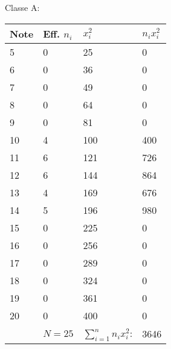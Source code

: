 \documentclass[a4paper,12pt]{scrartcl}
\begin{document}
\begin{figure}[h]
\begin{multicols}{2}
\begin{minipage}{0.49\linewidth}
\begin{center}
Classe A:
\end{center}

\begin{tabular}{|l|l|l|l|}
\hline
\textbf{Note} & \textbf{Eff. $n_i$} & \textbf{$x_i^2$} & \textbf{$n_i x_i^2$} \\ \hline
5    & 0              & 25      & 0           \\ \hline
6    & 0              & 36      & 0           \\ \hline
7    & 0              & 49      & 0           \\ \hline
8    & 0              & 64      & 0           \\ \hline
9    & 0              & 81      & 0           \\ \hline
10   & 4              & 100     & 400         \\ \hline
11   & 6              & 121     & 726         \\ \hline
12   & 6              & 144     & 864         \\ \hline
13   & 4              & 169     & 676         \\ \hline
14   & 5              & 196     & 980         \\ \hline
15   & 0              & 225     & 0           \\ \hline
16   & 0              & 256     & 0           \\ \hline
17   & 0              & 289     & 0           \\ \hline
18   & 0              & 324     & 0           \\ \hline
19   & 0              & 361     & 0           \\ \hline
20   & 0              & 400     & 0           \\ \hline
     & $N = 25$       & $\sum_{i=1}^{n}n_i x_i^2$: & 3646        \\ \hline
\end{tabular}
\end{minipage}


\end{multicols}
\end{figure}
\end{document}
